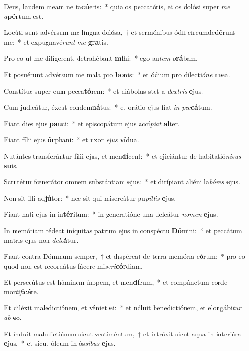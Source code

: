 \item Deus, laudem meam ne ta\textbf{cú}eris:~* quia os peccatóris, et os dolósi super \textit{me} \textit{a}\textbf{pér}tum est.
\item Locúti sunt advérsum me lingua dolósa,~† et sermónibus ódii circumde\textbf{dé}runt me:~* et expugnavé\textit{runt} \textit{me} \textbf{gra}tis.
\item Pro eo ut me dilígerent, detrahébant \textbf{mi}hi:~* ego au\textit{tem} \textit{o}\textbf{rá}bam.
\item Et posuérunt advérsum me mala pro \textbf{bo}nis:~* et ódium pro dilecti\textit{ó}\textit{ne} \textbf{me}a.
\item Constítue super eum pecca\textbf{tó}rem:~* et diábolus stet a \textit{dex}\textit{tris} \textbf{e}jus.
\item Cum judicátur, éxeat condem\textbf{ná}tus:~* et orátio ejus fiat \textit{in} \textit{pec}\textbf{cá}tum.
\item Fiant dies ejus \textbf{pau}ci:~* et episcopátum ejus accí\textit{pi}\textit{at} \textbf{al}ter.
\item Fiant fílii ejus \textbf{ór}phani:~* et uxor \textit{e}\textit{jus} \textbf{ví}dua.
\item Nutántes transferántur fílii ejus, et men\textbf{dí}cent:~* et ejiciántur de habitatió\textit{ni}\textit{bus} \textbf{su}is.
\item Scrutétur fœnerátor omnem substántiam \textbf{e}jus:~* et dirípiant aliéni la\textit{bó}\textit{res} \textbf{e}jus.
\item Non sit illi ad\textbf{jú}tor:~* nec sit qui misereátur pu\textit{píl}\textit{lis} \textbf{e}jus.
\item Fiant nati ejus in in\textbf{tér}itum:~* in generatióne una deleátur \textit{no}\textit{men} \textbf{e}jus.
\item In memóriam rédeat iníquitas patrum ejus in conspéctu \textbf{Dó}mini:~* et peccátum matris ejus non \textit{de}\textit{le}\textbf{á}tur.
\item Fiant contra Dóminum semper,~† et dispéreat de terra memória e\textbf{ó}rum:~* pro eo quod non est recordátus fácere mi\textit{se}\textit{ri}\textbf{cór}diam.
\item Et persecútus est hóminem ínopem, et men\textbf{dí}cum,~* et compúnctum corde mor\textit{ti}\textit{fi}\textbf{cá}re.
\item Et diléxit maledictiónem, et véniet \textbf{e}i:~* et nóluit benedictiónem, et elongábi\textit{tur} \textit{ab} \textbf{e}o.
\item Et índuit maledictiónem sicut vestiméntum,~† et intrávit sicut aqua in interióra \textbf{e}jus,~* et sicut óleum in ós\textit{si}\textit{bus} \textbf{e}jus.
